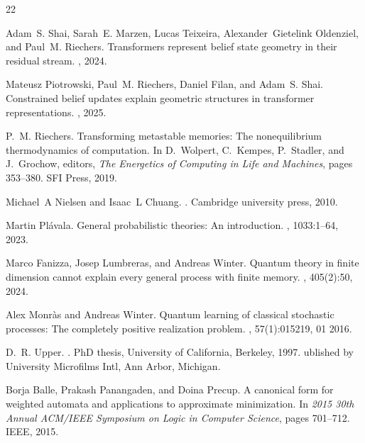 \documentclass[prx,nofootinbib,onecolumn,showkeys,groupaddress,preprintnumbers,floatfix,
superscriptaddress]{revtex4-1}
\begin{document}
%

%

\begin{thebibliography}{22}
	
Adam~S. Shai, Sarah~E. Marzen, Lucas Teixeira, Alexander~Gietelink Oldenziel, and Paul~M. Riechers.
\newblock Transformers represent belief state geometry in their residual stream.
, 2024.

Mateusz Piotrowski, Paul~M. Riechers, Daniel Filan, and Adam~S. Shai.
\newblock Constrained belief updates explain geometric structures in transformer representations.
, 2025.

P.~M. Riechers.
\newblock Transforming metastable memories: The nonequilibrium thermodynamics of computation.
\newblock In D.~Wolpert, C.~Kempes, P.~Stadler, and J.~Grochow, editors, {\em The Energetics of Computing in Life and Machines}, pages 353--380. SFI Press, 2019.

Michael~A Nielsen and Isaac~L Chuang.
.
\newblock Cambridge university press, 2010.

Martin Pl{\'a}vala.
\newblock General probabilistic theories: {A}n introduction.
, 1033:1--64, 2023.

Marco Fanizza, Josep Lumbreras, and Andreas Winter.
\newblock Quantum theory in finite dimension cannot explain every general process with finite memory.
, 405(2):50, 2024.

Alex Monràs and Andreas Winter.
\newblock Quantum learning of classical stochastic processes: {T}he completely positive realization problem.
, 57(1):015219, 01 2016.

D.~R. Upper.
.
\newblock PhD thesis, University of California, Berkeley, 1997.
ublished by University Microfilms Intl, Ann Arbor, Michigan.

Borja Balle, Prakash Panangaden, and Doina Precup.
\newblock A canonical form for weighted automata and applications to approximate minimization.
\newblock In {\em 2015 30th Annual ACM/IEEE Symposium on Logic in Computer Science}, pages 701--712. IEEE, 2015.


\end{thebibliography}
\end{document}
